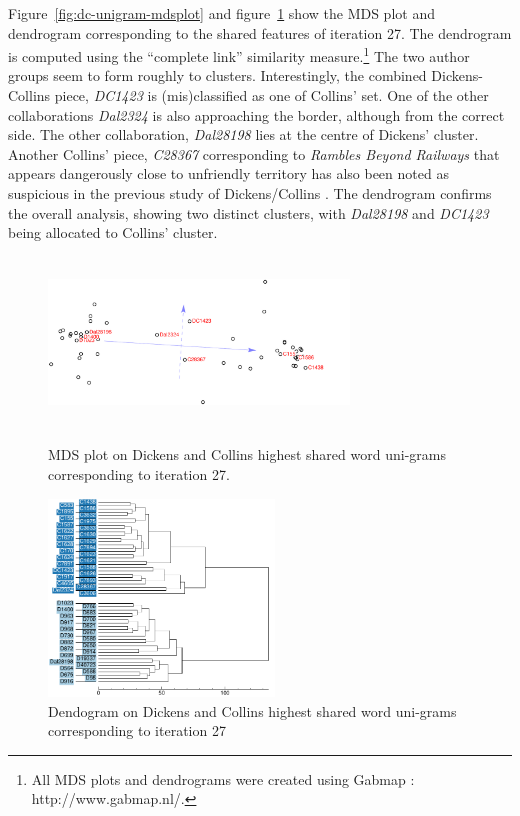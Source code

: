 \documentclass[a4paper,10pt,twoside,fleqn]{article}
\begin{document}
Figure~\ref{fig:dc-unigram-mdsplot} and figure~\ref{fig:dc-unigram-dendo}
show the MDS plot and dendrogram corresponding to the shared features of
iteration 27.
The dendrogram is computed using the ``complete link'' similarity
measure.\footnote{All MDS plots and dendrograms
were created using Gabmap \cite{nerbonne2011gabmap}: http://www.gabmap.nl/. }
The two author groups seem to form roughly to clusters.
Interestingly, the combined Dickens-Collins piece, \emph{DC1423} is
(mis)classified as one of Collins' set. One of the other collaborations
\emph{Dal2324} is also approaching the border, although from the correct
side. The other collaboration, \emph{Dal28198} lies at the centre of
Dickens' cluster.
Another Collins' piece, \emph{C28367} corresponding to
\emph{Rambles Beyond Railways} that appears dangerously close to
unfriendly territory has also been noted as suspicious in the
previous study of Dickens/Collins \cite{Tabata2012}.
The dendrogram confirms the overall analysis, showing two distinct
clusters, with \emph{Dal28198} and \emph{DC1423} being allocated
to Collins' cluster.



\begin{figure}
\centering
\parbox{8cm}{
\includegraphics[width=8cm,height=4.5cm]{mdsplot/dc-wuni-DC1423.pdf}
\caption{MDS plot on Dickens and Collins highest shared word uni-grams
corresponding to iteration 27.}
\label{fig:dc-unigram-mdsplot}}
\qquad
\begin{minipage}{6cm}
\includegraphics[width=6cm]{dend/dc-wuni-cl-DC1423.pdf}
\caption{Dendogram on Dickens and Collins highest shared word uni-grams
corresponding to iteration 27}
\label{fig:dc-unigram-dendo}
\end{minipage}
\end{figure}
\end{document}
